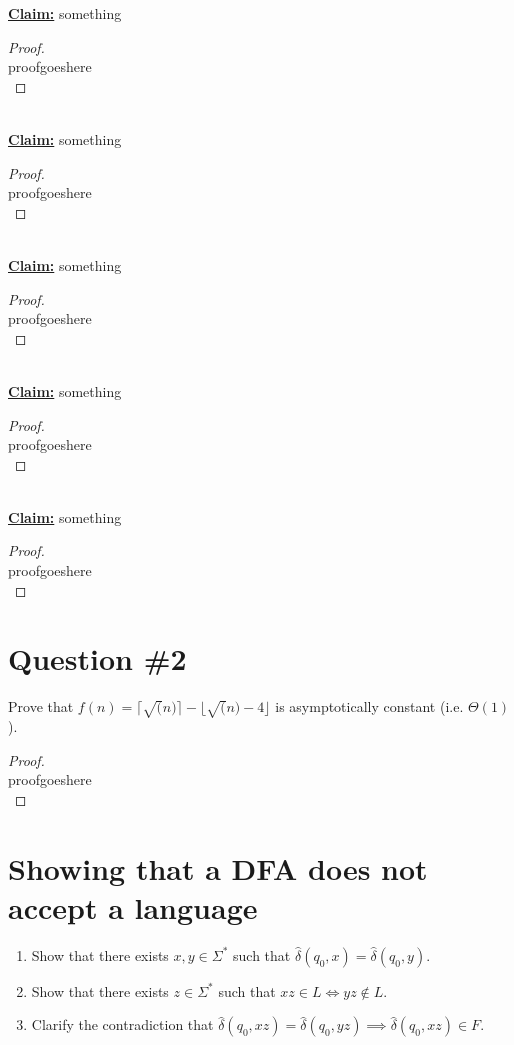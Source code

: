 \documentclass[12pt]{article}
\begin{document}
\underline{\textbf{Claim:}} something \\
\begin{proof}
\leavevmode\\
    proofgoeshere \\
\end{proof}
\leavevmode\\
\underline{\textbf{Claim:}} something \\
\begin{proof}
\leavevmode\\
    proofgoeshere \\
\end{proof}
\leavevmode\\
\underline{\textbf{Claim:}} something \\
\begin{proof}
\leavevmode\\
    proofgoeshere \\
\end{proof}
\leavevmode\\
\underline{\textbf{Claim:}} something \\
\begin{proof}
\leavevmode\\
    proofgoeshere \\
\end{proof}
\leavevmode\\
\underline{\textbf{Claim:}} something \\
\begin{proof}
\leavevmode\\
    proofgoeshere \\
\end{proof}
\pagebreak

\section*{Question \#2}
Prove that \( f(n) = \lceil \sqrt(n) \rceil - \lfloor \sqrt(n) - 4 \rfloor\) is asymptotically constant (i.e. \( \Theta(1)\)).
\begin{proof}
\leavevmode\\
    proofgoeshere \\
\end{proof}
\pagebreak

\section*{Showing that a DFA does not accept a language}
\begin{enumerate}
    \item Show that there exists \( x, y \in \Sigma ^* \) such that \( \hat{\delta}(q_0, x) = \hat{\delta}(q_0, y) \).
    \item Show that there exists \( z \in \Sigma^* \) such that \( xz \in L \iff yz \notin L \).
    \item Clarify the contradiction that \( \hat{\delta}(q_0, xz) = \hat{\delta}(q_0, yz) \implies \hat{\delta}(q_0, xz) \in F \).
\end{enumerate}
\pagebreak
\end{document}
